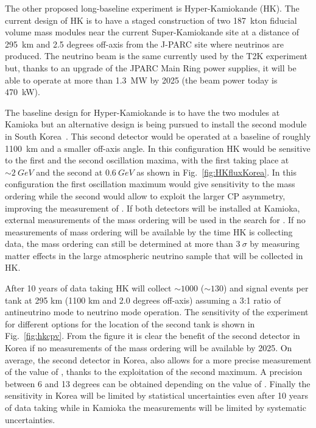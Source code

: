 The other proposed long-baseline experiment is Hyper-Kamiokande (HK). The current design of HK is to have a staged construction of two 187~kton fiducial volume mass modules near the current Super-Kamiokande site at a distance of 295~km and 2.5 degrees off-axis from the J-PARC site where neutrinos are produced. The neutrino beam is the same currently used by the T2K experiment but, thanks to an upgrade of the JPARC Main Ring power supplies, it will be able to operate at more than 1.3~MW  by 2025 (the beam power today is 470~kW).

The baseline design  for Hyper-Kamiokande is to have the two modules at Kamioka but an alternative design is being pursued to install the second module in South Korea~\cite{Abe:2016ero}. This second detector would be operated at a baseline of roughly 1100~km and a smaller off-axis angle. In this configuration HK would be sensitive to the first and the second oscillation maxima, with the first taking place at $\sim2~GeV$ and the second at $0.6~GeV$ as shown in Fig.~\ref{fig:HKfluxKorea}. In this configuration the first oscillation maximum would give sensitivity to the mass ordering while the second would allow to exploit the larger CP asymmetry, improving the measurement of \dcp.  If both detectors will be installed at Kamioka, external measurements of the mass ordering will be used in the search for \dcp. If no measurements of mass ordering will be available by the time HK is collecting data, the mass ordering can still be determined at more than $3~\sigma$ by measuring matter effects in the large atmospheric neutrino sample that will be collected in HK.    

After 10 years of data taking  HK will collect $\sim1000$ ($\sim130$) \nue and \nueb signal events per tank at 295 km (1100 km and 2.0 degrees off-axis) assuming a 3:1 ratio of antineutrino mode to neutrino mode operation. The sensitivity of the experiment for different options for the location of the second tank is shown in Fig.~\ref{fig:hkcpv}. From the figure it is clear the benefit of the second detector in Korea if no measurements of the mass ordering will be available by 2025. On average, the second detector in Korea, also allows for a more precise measurement of the value of \dcp, thanks to the exploitation of the second maximum. A precision between 6 and 13 degrees can be obtained depending on the value of \dcp. Finally the sensitivity in Korea will be limited by statistical uncertainties even after 10 years of data taking while in Kamioka the measurements will be limited by systematic uncertainties.

